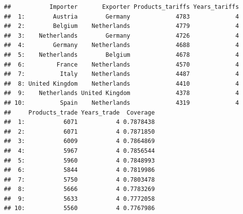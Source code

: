 \documentclass[10pt,]{article}
\newenvironment{Shaded}{\begin{snugshade}}{\end{snugshade}}
\newcommand{\KeywordTok}[1]{\textcolor[rgb]{0.13,0.29,0.53}{\textbf{{#1}}}}
\newcommand{\DataTypeTok}[1]{\textcolor[rgb]{0.13,0.29,0.53}{{#1}}}
\newcommand{\DecValTok}[1]{\textcolor[rgb]{0.00,0.00,0.81}{{#1}}}
\newcommand{\StringTok}[1]{\textcolor[rgb]{0.31,0.60,0.02}{{#1}}}
\newcommand{\NormalTok}[1]{{#1}}
\begin{document}
\begin{Shaded}
\end{Shaded}

\begin{verbatim}
##           Importer       Exporter Products_tariffs Years_tariffs
##  1:        Austria        Germany             4783             4
##  2:        Belgium    Netherlands             4779             4
##  3:    Netherlands        Germany             4726             4
##  4:        Germany    Netherlands             4688             4
##  5:    Netherlands        Belgium             4678             4
##  6:         France    Netherlands             4570             4
##  7:          Italy    Netherlands             4487             4
##  8: United Kingdom    Netherlands             4410             4
##  9:    Netherlands United Kingdom             4378             4
## 10:          Spain    Netherlands             4319             4
##     Products_trade Years_trade  Coverage
##  1:           6071           4 0.7878438
##  2:           6071           4 0.7871850
##  3:           6009           4 0.7864869
##  4:           5967           4 0.7856544
##  5:           5960           4 0.7848993
##  6:           5844           4 0.7819986
##  7:           5750           4 0.7803478
##  8:           5666           4 0.7783269
##  9:           5633           4 0.7772058
## 10:           5560           4 0.7767986
\end{verbatim}
\end{document}
